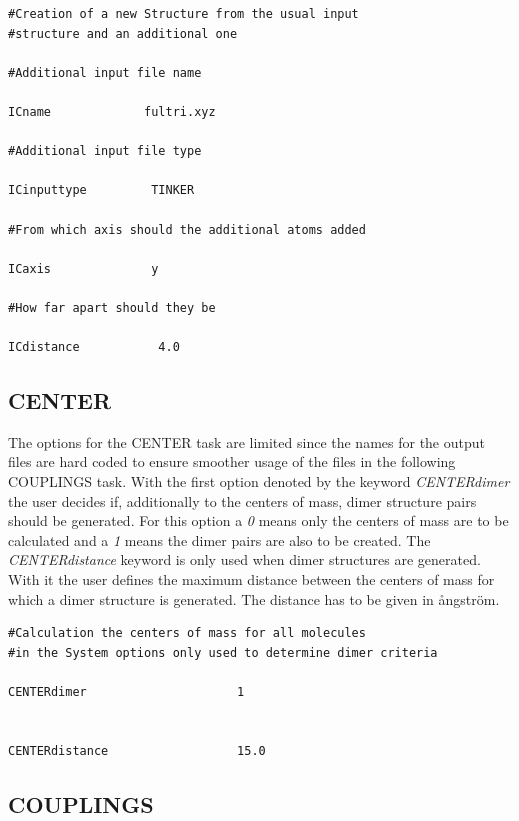 \documentclass[10pt,a4paper]{article} %
\begin{document}
\begin{lstlisting}
#Creation of a new Structure from the usual input 
#structure and an additional one

#Additional input file name

ICname             fultri.xyz

#Additional input file type 

ICinputtype         TINKER

#From which axis should the additional atoms added 

ICaxis              y

#How far apart should they be 

ICdistance           4.0
\end{lstlisting}


	\subsection{CENTER}
	
	The options for the CENTER task are limited since the names for the output files are hard coded to ensure smoother usage of the files in the following COUPLINGS task. With the first option denoted by the keyword \textit{CENTERdimer} the user decides if, additionally to the centers of mass, dimer structure pairs should be generated.
For this option a \textit{0} means only the centers of mass are to be calculated and a \textit{1} means the dimer pairs are also to be created. The \textit{CENTERdistance} keyword is only used when dimer structures are generated. With it the user defines the maximum distance between the centers of mass for which a dimer structure is generated. The distance has to be given in \aa ngström.\\
\begin{lstlisting}
#Calculation the centers of mass for all molecules
#in the System options only used to determine dimer criteria

CENTERdimer                     1


CENTERdistance                  15.0 
\end{lstlisting}

	\subsection{COUPLINGS}
	
\end{document}
